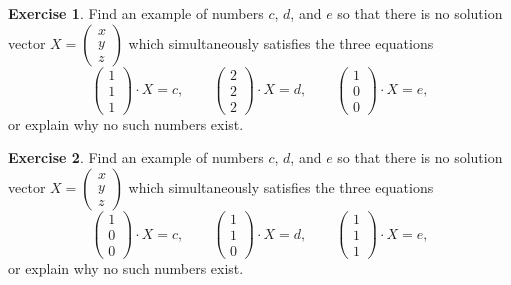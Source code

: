 \documentclass[11pt]{amsart}
\theoremstyle{definition}
\newtheorem{exercise}{Exercise}
\begin{document}
\begin{exercise}
Find an example of numbers $c$, $d$, and $e$ so that there is no solution vector $X = \left( \begin{smallmatrix} x \\ y \\ z \end{smallmatrix} \right)$ which simultaneously satisfies the three equations
\begin{equation*}
\begin{pmatrix} 1 \\ 1 \\ 1 \end{pmatrix} \cdot X = c, \qquad
\begin{pmatrix} 2 \\ 2 \\ 2 \end{pmatrix} \cdot X = d, \qquad
\begin{pmatrix} 1 \\ 0 \\ 0 \end{pmatrix} \cdot X = e,
\end{equation*}
or explain why no such numbers exist.
\end{exercise}

\begin{exercise}
Find an example of numbers $c$, $d$, and $e$ so that there is no solution vector $X = \left( \begin{smallmatrix} x \\ y \\ z \end{smallmatrix} \right)$ which simultaneously satisfies the three equations
\begin{equation*}
\begin{pmatrix} 1 \\ 0 \\ 0 \end{pmatrix} \cdot X = c, \qquad
\begin{pmatrix} 1 \\ 1 \\ 0 \end{pmatrix} \cdot X = d, \qquad
\begin{pmatrix} 1 \\ 1 \\ 1 \end{pmatrix} \cdot X = e,
\end{equation*}
or explain why no such numbers exist.
\end{exercise}
\end{document}
